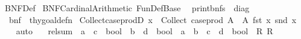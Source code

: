 %
\begin{isabellebody}%
%
%
\isadelimdocument
%
\endisadelimdocument
%
\isatagdocument
%
\isamarkuptrue%
%
\endisatagdocument
{\isafolddocument}%
%
\isadelimdocument
%
\endisadelimdocument
%
\isadelimtheory
%
\endisadelimtheory
%
\isatagtheory
{}\isamarkupfalse%
\ BNF{\isacharunderscore}{\kern0pt}Def\isanewline
{}\ BNF{\isacharunderscore}{\kern0pt}Cardinal{\isacharunderscore}{\kern0pt}Arithmetic\ Fun{\isacharunderscore}{\kern0pt}Def{\isacharunderscore}{\kern0pt}Base\isanewline
{}\isanewline
\ \ {\isachardoublequoteopen}print{\isacharunderscore}{\kern0pt}bnfs{\isachardoublequoteclose}\ {\isacharcolon}{\kern0pt}{\isacharcolon}{\kern0pt}\ diag\ \isanewline
\ \ {\isachardoublequoteopen}bnf{\isachardoublequoteclose}\ {\isacharcolon}{\kern0pt}{\isacharcolon}{\kern0pt}\ thy{\isacharunderscore}{\kern0pt}goal{\isacharunderscore}{\kern0pt}defn\isanewline
{}%
\endisatagtheory
{\isafoldtheory}%
%
\isadelimtheory
\isanewline
%
\endisadelimtheory
\isanewline
{}\isamarkupfalse%
\ Collect{\isacharunderscore}{\kern0pt}case{\isacharunderscore}{\kern0pt}prodD{\isacharcolon}{\kern0pt}\ {\isachardoublequoteopen}x\ {\isasymin}\ Collect\ {\isacharparenleft}{\kern0pt}case{\isacharunderscore}{\kern0pt}prod\ A{\isacharparenright}{\kern0pt}\ {\isasymLongrightarrow}\ A\ {\isacharparenleft}{\kern0pt}fst\ x{\isacharparenright}{\kern0pt}\ {\isacharparenleft}{\kern0pt}snd\ x{\isacharparenright}{\kern0pt}{\isachardoublequoteclose}\isanewline
%
\isadelimproof
\ \ %
\endisadelimproof
%
\isatagproof
{}\isamarkupfalse%
\ auto%
\endisatagproof
{\isafoldproof}%
%
\isadelimproof
\isanewline
%
\endisadelimproof
\isanewline
{}\isamarkupfalse%
\isanewline
\ \ \ rel{\isacharunderscore}{\kern0pt}sum\ {\isacharcolon}{\kern0pt}{\isacharcolon}{\kern0pt}\ {\isachardoublequoteopen}{\isacharparenleft}{\kern0pt}{\isacharprime}{\kern0pt}a\ {\isasymRightarrow}\ {\isacharprime}{\kern0pt}c\ {\isasymRightarrow}\ bool{\isacharparenright}{\kern0pt}\ {\isasymRightarrow}\ {\isacharparenleft}{\kern0pt}{\isacharprime}{\kern0pt}b\ {\isasymRightarrow}\ {\isacharprime}{\kern0pt}d\ {\isasymRightarrow}\ bool{\isacharparenright}{\kern0pt}\ {\isasymRightarrow}\ {\isacharprime}{\kern0pt}a\ {\isacharplus}{\kern0pt}\ {\isacharprime}{\kern0pt}b\ {\isasymRightarrow}\ {\isacharprime}{\kern0pt}c\ {\isacharplus}{\kern0pt}\ {\isacharprime}{\kern0pt}d\ {\isasymRightarrow}\ bool{\isachardoublequoteclose}\ \ R{}\ R{}\isanewline

\end{isabellebody}
